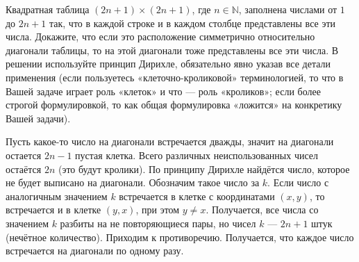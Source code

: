 \begin{task}{73}
Квадратная таблица $(2n+1)\times(2n+1)$, где $n\in\mathbb{N}$, заполнена числами от $1$ до $2n+1$ так, что в каждой строке и в каждом столбце представлены все эти числа. Докажите, что если это расположение симметрично относительно диагонали таблицы, то на этой диагонали тоже представлены все эти числа. В решении используйте принцип Дирихле, обязательно явно указав все детали применения (если пользуетесь «клеточно-кроликовой» терминологией, то что в Вашей задаче играет роль «клеток» и что — роль «кроликов»; если более строгой формулировкой, то как общая формулировка «ложится» на конкретику Вашей задачи).
\end{task}

\begin{solution}
Пусть какое-то число на диагонали встречается дважды, значит на диагонали остается $2n-1$ пустая клетка. Всего различных неиспользованных чисел остаётся $2n$ (это будут кролики). По принципу Дирихле найдётся число, которое не будет выписано на диагонали. Обозначим такое число за $k$. Если число с аналогичным значением $k$ встречается в клетке с координатами $(x, y)$, то встречается и в клетке $(y, x)$, при этом $y\neq x$. Получается, все числа со значением $k$ разбиты на не повторяющиеся пары, но чисел $k$ --- $2n+1$ штук (нечётное количество). Приходим к противоречию. Получается, что каждое число встречается на диагонали по одному разу. 
\end{solution}